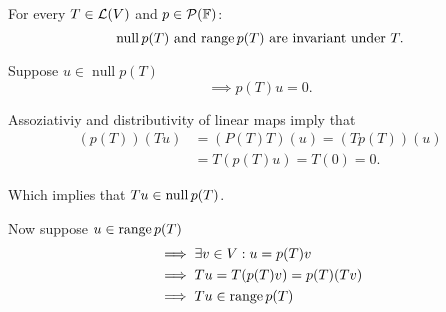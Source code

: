 \begin{thm} 
  \label{thm: null space and range of p(T) are invariant under T}
  For every $T \in \mathcal{L}(V)$ and $p\in \mathcal{P} (\mathbb{F})$:
  \begin{equation}
    \mynull p(T)$ and $\myrange p(T)$ are invariant under $T.
  \end{equation}
\end{thm}
\begin{prf}
   Suppose $u\in \operatorname{null} p(T)$
  \begin{equation}
    \implies p(T)u = 0.
  \end{equation}

  Assoziativiy and distributivity of linear maps imply that
  \begin{equation}
    \begin{aligned}
      (p(T))(Tu)&=(P(T)T)(u)=(Tp(T))(u) \\
      &=T(p(T)u)=T(0)=0.
    \end{aligned}
  \end{equation}

  Which implies that $Tu \in \operatorname{null} p(T)$.

   Now suppose $u \in \operatorname{range} p(T)$
  \begin{equation}
    \begin{aligned}
      &\implies \exists v\in V: u=p(T)v \\
      &\implies Tu=T(p(T)v)=p(T)(Tv) \\
      &\implies Tu \in \operatorname{range} p(T)
    \end{aligned}
  \end{equation}
  \vspace{-1.1em}
\end{prf}